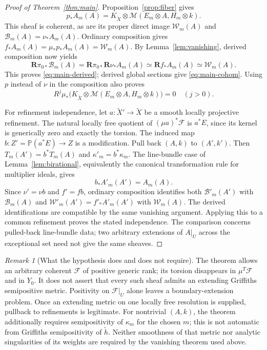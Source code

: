 \documentclass[11pt,reqno]{amsart}
\numberwithin{equation}{section}
\theoremstyle{definition}
\theoremstyle{remark}
\newtheorem{remark}[theorem]{Remark}
\newcommand{\FF}{\mathcal F}
\newcommand{\MM}{\mathcal M}
\newcommand{\WW}{\mathcal W}
\newcommand{\BB}{\mathcal B}
\newcommand{\PP}{\mathbb P}
\newcommand{\RR}{\mathbf R}
\begin{document}
\begin{proof}[Proof of Theorem~\ref{thm:main}]
Proposition~\ref{prop:fiber} gives
\begin{equation}\label{eq:pushp}
 p_*A_m(A)=K_{\widetilde X}\otimes\MM(E_m\otimes A,H_m\otimes k).
\end{equation}
This sheaf is coherent, as are its proper direct image $\WW_m(A)$ and $\BB_m(A)=\nu_*A_m(A)$. Ordinary composition gives
$f_*A_m(A)=\mu_*p_*A_m(A)=\WW_m(A)$.
By Lemma~\ref{lem:vanishing}, derived composition now yields
\[
 \RR\pi_{0*}\BB_m(A)
 =\RR\pi_{0*}\RR\nu_*A_m(A)
 \simeq\RR f_*A_m(A)\simeq\WW_m(A).
\]
This proves \eqref{eq:main-derived}; derived global sections give \eqref{eq:main-cohom}. Using $p$ instead of $\nu$ in the composition also proves
\begin{equation}\label{eq:basevanish}
 R^j\mu_*\bigl(K_{\widetilde X}\otimes
              \MM(E_m\otimes A,H_m\otimes k)\bigr)=0
 \quad(j>0).
\end{equation}

For refinement independence, let $a:\widetilde X'\to\widetilde X$ be a smooth locally projective refinement. The natural locally free quotient of $(\mu a)^*\FF$ is $a^*E$, since its kernel is generically zero and exactly the torsion. The induced map $b:Z'=\PP(a^*E)\to Z$ is a modification. Pull back $(A,k)$ to $(A',k')$. Then $T_m(A')=b^*T_m(A)$ and $\kappa'_m=b^*\kappa_m$. The line-bundle case of Lemma~\ref{lem:birational}, equivalently the canonical transformation rule for multiplier ideals, gives
\[
 b_*A'_m(A')=A_m(A).
\]
Since $\nu'=\nu b$ and $f'=fb$, ordinary composition identifies both $\BB'_m(A')$ with $\BB_m(A)$ and $\WW'_m(A')=f'_*A'_m(A')$ with $\WW_m(A)$. The derived identifications are compatible by the same vanishing argument. Applying this to a common refinement proves the stated independence. The comparison concerns pulled-back line-bundle data; two arbitrary extensions of $A|_U$ across the exceptional set need not give the same sheaves.
\end{proof}

\begin{remark}[What the hypothesis does and does not require]
The theorem allows an arbitrary coherent $\FF$ of positive generic rank; its torsion disappears in $\mu^T\FF$ and in $Y_0$. It does not assert that every such sheaf admits an extending Griffiths semipositive metric. Positivity on $\FF|_U$ alone leaves a boundary-extension problem. Once an extending metric on one locally free resolution is supplied, pullback to refinements is legitimate. For nontrivial $(A,k)$, the theorem additionally requires semipositivity of $\kappa_m$ for the chosen $m$; this is not automatic from Griffiths semipositivity of $\widetilde h$. Neither smoothness of that metric nor analytic singularities of its weights are required by the vanishing theorem used above.
\end{remark}
\end{document}
